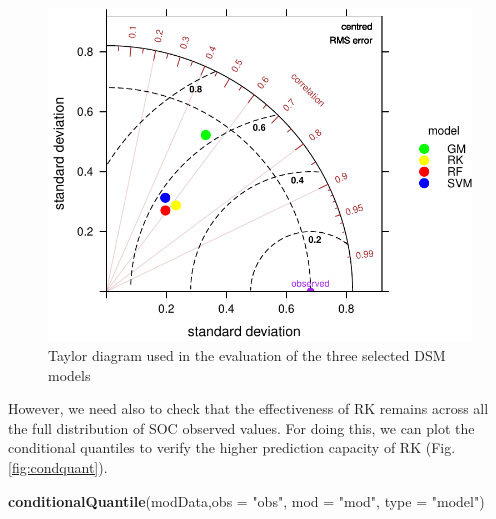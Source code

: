 \documentclass[10pt,b5paper,]{book}
\newenvironment{Shaded}{\begin{snugshade}}{\end{snugshade}}
\newcommand{\DataTypeTok}[1]{\textcolor[rgb]{0.13,0.29,0.53}{#1}}
\newcommand{\KeywordTok}[1]{\textcolor[rgb]{0.13,0.29,0.53}{\textbf{#1}}}
\newcommand{\NormalTok}[1]{#1}
\newcommand{\StringTok}[1]{\textcolor[rgb]{0.31,0.60,0.02}{#1}}
\theoremstyle{definition}
\theoremstyle{definition}
\theoremstyle{definition}
\theoremstyle{remark}
\begin{document}
\begin{figure}
\centering
\includegraphics{SOCMapping_files/figure-latex/taylor-1.pdf}
\caption{\label{fig:taylor}Taylor diagram used in the evaluation of the
three selected DSM models}
\end{figure}

However, we need also to check that the effectiveness of RK remains
across all the full distribution of SOC observed values. For doing this,
we can plot the conditional quantiles to verify the higher prediction
capacity of RK (Fig. \ref{fig:condquant}).

\begin{Shaded}
\begin{Highlighting}[]
\KeywordTok{conditionalQuantile}\NormalTok{(modData,}\DataTypeTok{obs =} \StringTok{"obs"}\NormalTok{, }\DataTypeTok{mod =} \StringTok{"mod"}\NormalTok{, }\DataTypeTok{type =} \StringTok{"model"}\NormalTok{)}
\end{Highlighting}
\end{Shaded}
\end{document}
